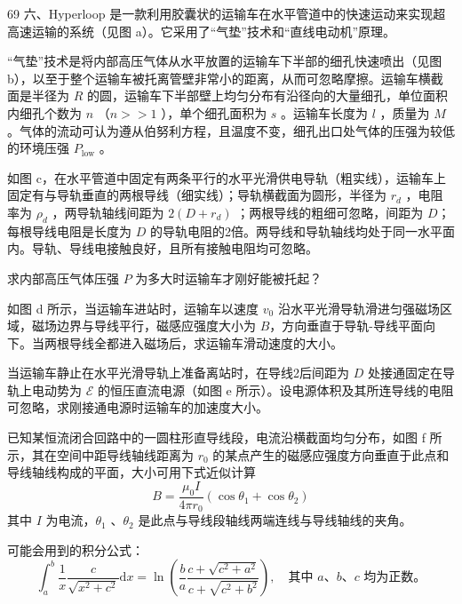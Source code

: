\begin{problem}[33届物理竞赛决赛]{69}
    六、Hyperloop 是一款利用胶囊状的运输车在水平管道中的快速运动来实现超高速运输的系统（见图 a）。它采用了“气垫”技术和“直线电动机”原理。

    “气垫”技术是将内部高压气体从水平放置的运输车下半部的细孔快速喷出（见图 b），以至于整个运输车被托离管壁非常小的距离，从而可忽略摩擦。运输车横截面是半径为 $R$ 的圆，运输车下半部壁上均匀分布有沿径向的大量细孔，单位面积内细孔个数为 $n$ （$n >> 1$ ），单个细孔面积为 $s$ 。运输车长度为 $l$ ，质量为 $M$ 。气体的流动可认为遵从伯努利方程，且温度不变，细孔出口处气体的压强为较低的环境压强 $P_{\mathrm{low}}$ 。

    如图 c，在水平管道中固定有两条平行的水平光滑供电导轨（粗实线），运输车上固定有与导轨垂直的两根导线（细实线）；导轨横截面为圆形，半径为 $r_{d}$ ，电阻率为 $\rho_{d}$ ，两导轨轴线间距为 $2(D+r_{d})$ ；两根导线的粗细可忽略，间距为 $D$；每根导线电阻是长度为 $D$ 的导轨电阻的2倍。两导线和导轨轴线均处于同一水平面内。导轨、导线电接触良好，且所有接触电阻均可忽略。
    \begin{subproblem}
        求内部高压气体压强 $P$ 为多大时运输车才刚好能被托起？
    \end{subproblem}
    \begin{subproblem}
        如图 d 所示，当运输车进站时，运输车以速度 $v_{0}$ 沿水平光滑导轨滑进匀强磁场区域，磁场边界与导线平行，磁感应强度大小为 $B$，方向垂直于导轨-导线平面向下。当两根导线全都进入磁场后，求运输车滑动速度的大小。
    \end{subproblem}
    \begin{subproblem}
        当运输车静止在水平光滑导轨上准备离站时，在导线2后间距为 $D$ 处接通固定在导轨上电动势为 $\mathcal{E}$ 的恒压直流电源（如图 e 所示）。设电源体积及其所连导线的电阻可忽略，求刚接通电源时运输车的加速度大小。

        已知某恒流闭合回路中的一圆柱形直导线段，电流沿横截面均匀分布，如图 f 所示，其在空间中距导线轴线距离为 $r_{0}$ 的某点产生的磁感应强度方向垂直于此点和导线轴线构成的平面，大小可用下式近似计算
        \begin{equation*}
            B = \frac{\mu_{0} I}{4\pi r_{0}} (\cos\theta_{1} + \cos\theta_{2})
        \end{equation*}
        其中 $I$ 为电流，$\theta_{1}$ 、$\theta_{2}$ 是此点与导线段轴线两端连线与导线轴线的夹角。

        可能会用到的积分公式：
        \begin{equation*}
            \int_{a}^{b} \frac{1}{x} \frac{c}{\sqrt{x^{2} + c^{2}}} \mathrm{d}x = \ln\left( \frac{b}{a} \frac{c + \sqrt{c^{2} + a^{2}}}{c + \sqrt{c^{2} + b^{2}}} \right), \quad \text{其中 } a、b、c \text{ 均为正数。}
        \end{equation*}
    \end{subproblem}
\end{problem}